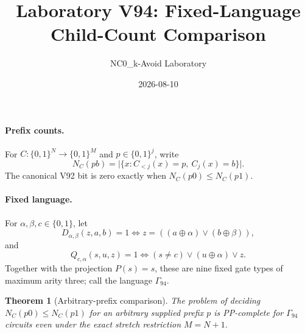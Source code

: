 \documentclass[11pt]{article}
\title{Laboratory V94: Fixed-Language Child-Count Comparison}
\author{NC0\_k-Avoid Laboratory}
\date{2026-08-10}
\newtheorem{theorem}{Theorem}
\newcommand{\bits}{\{0,1\}}
\begin{document}
\maketitle

\paragraph{Prefix counts.}
For $C:\bits^N\to\bits^M$ and $p\in\bits^j$, write
\[
 N_C(pb)=\bigl|\{x:C_{<j}(x)=p,\ C_j(x)=b\}\bigr|.
\]
The canonical V92 bit is zero exactly when $N_C(p0)\le N_C(p1)$.

\paragraph{Fixed language.}
For $\alpha,\beta,c\in\bits$, let
\[
 D_{\alpha,\beta}(z,a,b)=1
 \Longleftrightarrow
 z=((a\oplus\alpha)\lor(b\oplus\beta)),
\]
and
\[
 Q_{c,\alpha}(s,u,z)=1
 \Longleftrightarrow
 (s\ne c)\lor(u\oplus\alpha)\lor z.
\]
Together with the projection $P(s)=s$, these are nine fixed gate types of
maximum arity three; call the language $\Gamma_{94}$.

\begin{theorem}[Arbitrary-prefix comparison]
The problem of deciding $N_C(p0)\le N_C(p1)$ for an arbitrary supplied prefix
$p$ is PP-complete for $\Gamma_{94}$ circuits even under the exact stretch
restriction $M=N+1$.
\end{theorem}
\end{document}
